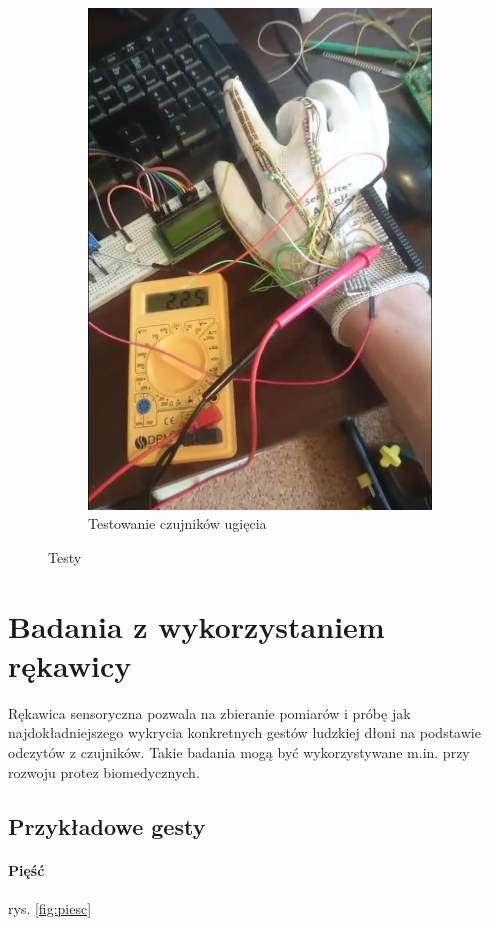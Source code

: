 \documentclass[12pt,a4paper]{article}
\begin{document}
\begin{figure}[ht!]
\begin{subfigure}{.5\textwidth}
	\includegraphics[width=.9\textwidth]{images/ugiecie.png}
	\caption{Testowanie czujników ugięcia}
	\label{fig:ugiecie}
\end{subfigure}
\caption{Testy}
\label{fig:testy}
\end{figure}

\section{Badania z wykorzystaniem rękawicy}
Rękawica sensoryczna pozwala na zbieranie pomiarów i próbę jak najdokładniejszego wykrycia konkretnych gestów ludzkiej dłoni na podstawie odczytów z czujników. Takie badania mogą być wykorzystywane m.in. przy rozwoju protez biomedycznych. 
\subsection{Przykładowe gesty}
\paragraph{Pięść}
rys. \ref{fig:piesc}
\end{document}
